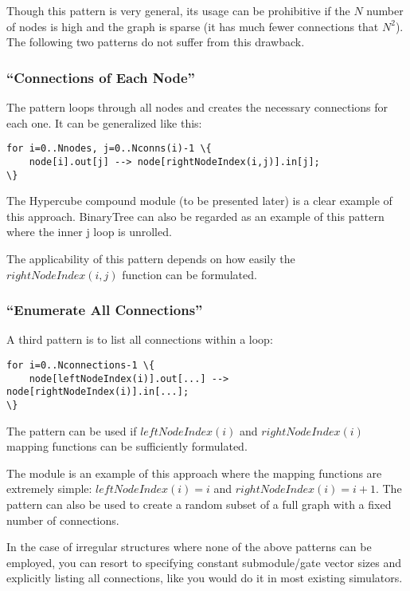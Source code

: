 Though this pattern is very general, its usage can be prohibitive if
the $N$ number of nodes is high and the graph is sparse (it has
much fewer connections that $N^2$). The following
two patterns do not suffer from this drawback.


\subsubsection{``Connections of Each Node''}

The pattern loops through all nodes and creates the necessary
connections for each one. It can be generalized like this:

\begin{Verbatim}[commandchars=\\\{\}]
for i=0..Nnodes, j=0..Nconns(i)-1 \{
    node[i].out[j] --> node[rightNodeIndex(i,j)].in[j];
\}
\end{Verbatim}

The Hypercube compound module (to be
presented later) is a clear example of this approach. BinaryTree can
also be regarded as an example of this pattern where the inner j loop
is unrolled.

The applicability of this pattern depends on how easily the $rightNodeIndex(i,j)$
function can be formulated.


\subsubsection{``Enumerate All Connections''}


A third pattern is to list all connections within a loop:

\begin{Verbatim}[commandchars=\\\{\}]
for i=0..Nconnections-1 \{
    node[leftNodeIndex(i)].out[...] --> node[rightNodeIndex(i)].in[...];
\}
\end{Verbatim}

The pattern can be used if $leftNodeIndex(i)$ and $rightNodeIndex(i)$
mapping functions can be sufficiently formulated.

The  module is an example of this approach where the mapping
functions are extremely simple: $leftNodeIndex(i)=i$ and $rightNodeIndex(i) = i+1$.
The pattern can also be used to create a random subset of a full
graph with a fixed number of connections.

In the case of irregular structures where none of the above patterns
can be employed, you can resort to specifying constant submodule/gate
vector sizes and explicitly listing all connections, like you
would do it in most existing simulators.



